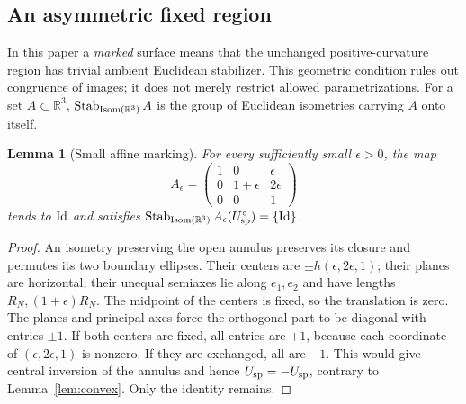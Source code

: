 \documentclass[11pt]{amsart}
\newtheorem{lemma}[theorem]{Lemma}
\theoremstyle{definition}
\theoremstyle{remark}
\newcommand{\R}{\mathbb R}\newcommand{\Sph}{\mathbb S}
\DeclareMathOperator{\Isom}{Isom}\DeclareMathOperator{\Emb}{Emb}
\numberwithin{equation}{section}
\begin{document}
\subsection{An asymmetric fixed region}
In this paper a \emph{marked} surface means that the unchanged
positive-curvature region has trivial ambient Euclidean stabilizer.
This geometric condition rules out congruence of images; it does not
merely restrict allowed parametrizations. For a set $A\subset\R^3$,
$\Stab_{\Isom(\R^3)}A$ is the group of Euclidean isometries carrying
$A$ onto itself.

\begin{lemma}[Small affine marking]\label{lem:ellipses-new}
For every sufficiently small $\epsilon>0$, the map
\[
 A_\epsilon=\begin{pmatrix}
 1&0&\epsilon\\0&1+\epsilon&2\epsilon\\0&0&1
 \end{pmatrix}
\]
tends to $\mathrm{Id}$ and satisfies
$\Stab_{\Isom(\R^3)}A_\epsilon(U_{\rm sp}^\circ)=\{\Id\}$.
\end{lemma}
\begin{proof}
An isometry preserving the open annulus preserves its closure and permutes
its two boundary ellipses. Their centers are
$\pm h(\epsilon,2\epsilon,1)$; their planes are horizontal; their unequal
semiaxes lie along $e_1,e_2$ and have lengths $R_N,(1+\epsilon)R_N$.
The midpoint of the centers is fixed, so the translation is zero.
The planes and principal axes force the orthogonal part to be diagonal
with entries $\pm1$. If both centers are fixed, all entries are $+1$,
because each coordinate of $(\epsilon,2\epsilon,1)$ is nonzero.
If they are exchanged, all are $-1$. This would give central inversion
of the annulus and hence $U_{\rm sp}=-U_{\rm sp}$, contrary to
Lemma~\ref{lem:convex}. Only the identity remains.
\end{proof}
\end{document}
